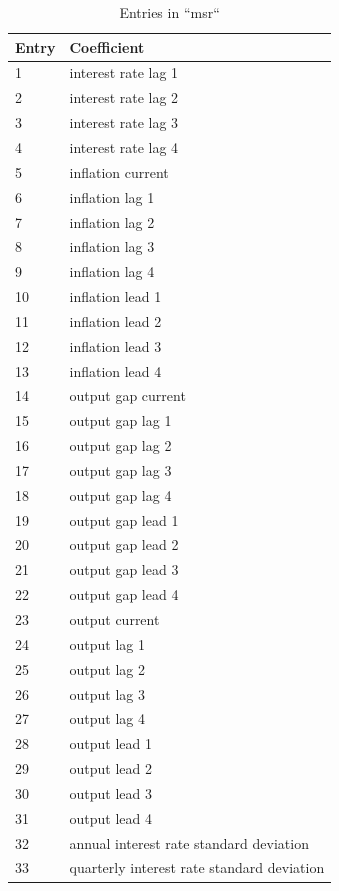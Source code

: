 \documentclass[10pt,a4paper]{article}
\begin{document}
\begin{table}
\caption{Entries in “msr“}
\begin{tabular}[t]
{ l l }
 \textbf{Entry} & \textbf{Coefficient} \\ 
\hline
\hline
 1 & interest rate lag 1 \\
 2 & interest rate lag 2 \\
 3 & interest rate lag 3 \\
 4 & interest rate lag 4 \\
 5 & inflation current \\
 6 & inflation lag 1 \\
 7 & inflation lag 2 \\
 8 & inflation lag 3 \\
 9 & inflation lag 4 \\
 10 & inflation lead 1 \\
 11 & inflation lead 2 \\
 12 & inflation lead 3 \\
 13 & inflation lead 4 \\
 14 & output gap current \\
 15 & output gap lag 1 \\
 16 & output gap lag 2 \\
 17 & output gap lag 3 \\
 18 & output gap lag 4 \\
 19 & output gap lead 1 \\
 20 & output gap lead 2 \\
 21 & output gap lead 3 \\
 22 & output gap lead 4 \\
 23 & output current \\
 24 & output lag 1 \\
 25 & output lag 2 \\
 26 & output lag 3 \\
 27 & output lag 4 \\
 28 & output lead 1 \\
 29 & output lead 2 \\
 30 & output lead 3 \\
 31 & output lead 4 \\
 32 & annual interest rate standard deviation \\
 33 & quarterly interest rate standard deviation \\
\hline
\end{tabular}
\end{table}
\pagebreak
\end{document}
